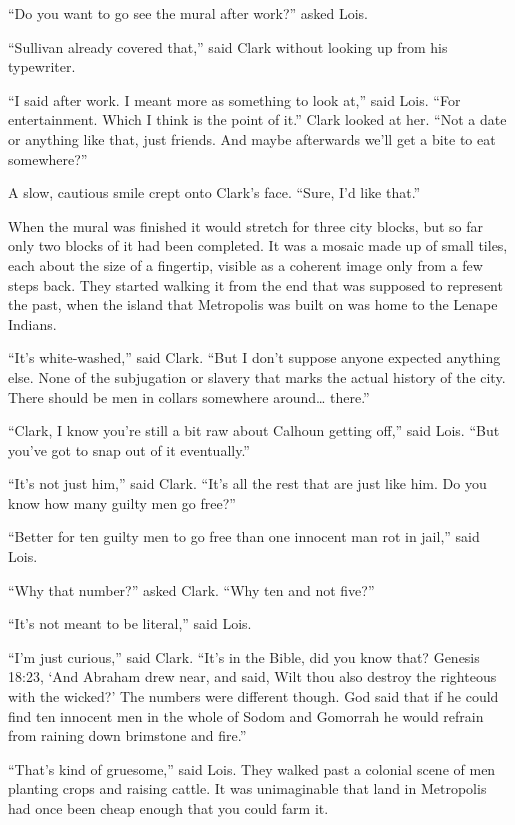 \documentclass[ebook,12pt]{memoir}
\begin{document}
``Do you want to go see the mural after work?'' asked Lois.

``Sullivan already covered that,'' said Clark without looking up from
his typewriter.

``I said after work. I meant more as something to look at,'' said Lois.
``For entertainment. Which I think is the point of it.'' Clark looked at
her. ``Not a date or anything like that, just friends. And maybe
afterwards we'll get a bite to eat somewhere?''

A slow, cautious smile crept onto Clark's face. ``Sure, I'd like that.''

When the mural was finished it would stretch for three city blocks, but
so far only two blocks of it had been completed. It was a mosaic made up
of small tiles, each about the size of a fingertip, visible as a
coherent image only from a few steps back. They started walking it from
the end that was supposed to represent the past, when the island that
Metropolis was built on was home to the Lenape Indians.

``It's white‐washed,'' said Clark. ``But I don't suppose anyone expected
anything else. None of the subjugation or slavery that marks the actual
history of the city. There should be men in collars somewhere
around\ldots{} there.''

``Clark, I know you're still a bit raw about Calhoun getting off,'' said
Lois. ``But you've got to snap out of it eventually.''

``It's not just him,'' said Clark. ``It's all the rest that are just
like him. Do you know how many guilty men go free?''

``Better for ten guilty men to go free than one innocent man rot in
jail,'' said Lois.

``Why that number?'' asked Clark. ``Why ten and not five?''

``It's not meant to be literal,'' said Lois.

``I'm just curious,'' said Clark. ``It's in the Bible, did you know
that? Genesis 18:23, `And Abraham drew near, and said, Wilt thou also
destroy the righteous with the wicked?' The numbers were different
though. God said that if he could find ten innocent men in the whole of
Sodom and Gomorrah he would refrain from raining down brimstone and
fire.''

``That's kind of gruesome,'' said Lois. They walked past a colonial
scene of men planting crops and raising cattle. It was unimaginable that
land in Metropolis had once been cheap enough that you could farm it.
\end{document}
